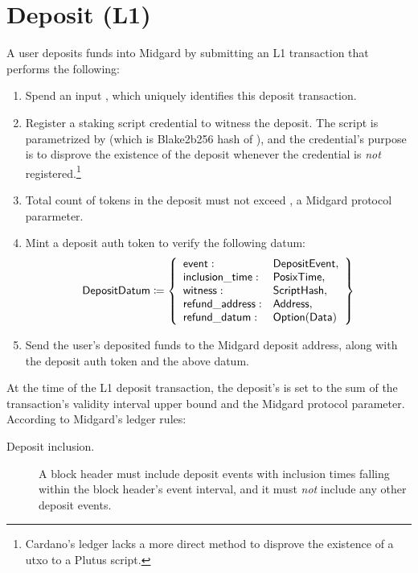 \documentclass[../midgard.tex]{subfiles}
\begin{document}
\section{Deposit (L1)}
\label{h:deposit}

A user deposits funds into Midgard by submitting an L1 transaction that performs the following:
\begin{enumerate}
    \item Spend an input , which uniquely identifies this deposit transaction.
    \item Register a staking script credential to witness the deposit.
      The script is parametrized by  (which is Blake2b256 hash of ), and the credential's purpose is to disprove the existence of the deposit whenever the credential is \emph{not} registered.\footnote{Cardano's ledger lacks a more direct method to disprove the existence of a utxo to a Plutus script.}
    \item Total count of tokens in the deposit must not exceed , a Midgard protocol pararmeter.
    \item Mint a deposit auth token to verify the following datum:
        \begin{equation*}
        \mathsf{DepositDatum} \coloneq \left\{
            \begin{array}{ll}
                \mathsf{event} : & \mathsf{DepositEvent}, \\
                \mathsf{inclusion\_time} : & \mathsf{PosixTime}, \\
                \mathsf{witness} : & \mathsf{ScriptHash}, \\
                \mathsf{refund\_address}: & \mathsf{Address}, \\
                \mathsf{refund\_datum}: & \mathsf{Option(Data)}
            \end{array}
            \right\}
        \end{equation*}
    \item Send the user's deposited funds to the Midgard deposit address, along with the deposit auth token and the above datum.
\end{enumerate}

At the time of the L1 deposit transaction, the deposit's  is set to the sum of the transaction's validity interval upper bound and the  Midgard protocol parameter.
According to Midgard's ledger rules:
\begin{description}
    \item[Deposit inclusion.] A block header must include deposit events with inclusion times falling within the block header's event interval, and it must \emph{not} include any other deposit events.
\end{description}
\end{document}
